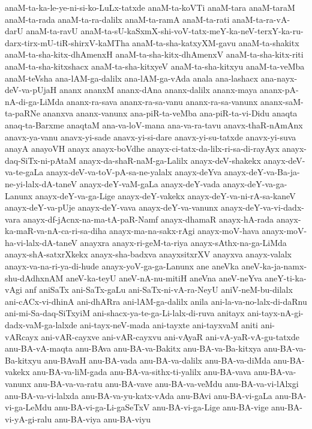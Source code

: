 {anaM-ta-ka-le-ye-ni-si-ko-LuLx-tatxde
anaM-ta-koVTi
anaM-tara
anaM-taraM
anaM-ta-rada
anaM-ta-ra-dalilx
anaM-ta-ramA
anaM-ta-rati
anaM-ta-ra-vA-darU
anaM-ta-ravU
anaM-ta-sU-kaSxmX-shi-voV-tatx-meY-ka-neV-terxY-ka-ru-darx-tirx-mU-tiR-shirxV-kaMTha
anaM-ta-sha-katxyXM-gavu
anaM-ta-shakitx
anaM-ta-sha-kitx-dhAmenxH
anaM-ta-sha-kitx-dhAmenxV
anaM-ta-sha-kitx-riti
anaM-ta-sha-kitxshacx
anaM-ta-sha-kitxyeV
anaM-ta-sha-kitxyu
anaM-ta-veMba
anaM-teVsha
ana-lAM-ga-dalilx
ana-lAM-ga-vAda
anala
ana-lashacx
ana-nayx-deV-va-pUjaH
ananx
ananxM
ananx-dAna
ananx-dalilx
ananx-maya
ananx-pA-nA-di-ga-LiMda
ananx-ra-sava
ananx-ra-sa-vanu
ananx-ra-sa-vanunx
ananx-saM-ta-paRNe
ananxva
ananx-vanunx
ana-piR-ta-veMba
ana-piR-ta-vi-Didu
anaqta
anaq-ta-Barxme
anaqtaM
ana-va-loV-mana
ana-va-ra-tavu
anavx-thaR-nAmAnx
anavx-ya-vanu
anavx-yi-sade
anavx-yi-si-dare
anavx-yi-su-tatxde
anavx-yi-suva
anayA
anayoVH
anayx
anayx-boVdhe
anayx-ci-tatx-da-lilx-ri-sa-di-rayAyx
anayx-daq-SiTx-ni-pAtaM
anayx-da-shaR-naM-ga-Lalilx
anayx-deV-shakekx
anayx-deV-va-te-gaLa
anayx-deV-va-toV-pA-sa-ne-yalalx
anayx-deYva
anayx-deY-va-Ba-ja-ne-yi-lalx-dA-taneV
anayx-deY-vaM-gaLa
anayx-deY-vada
anayx-deY-va-ga-Lanunx
anayx-deY-va-ga-Lige
anayx-deY-vakekx
anayx-deY-va-ni-rA-sa-kaneV
anayx-deY-va-pUje
anayx-deY-vava
anayx-deY-va-vanunx
anayx-deY-va-vi-dadx-vara
anayx-df-jAcnx-na-ma-tA-paR-Namf
anayx-dhamaR
anayx-hA-rada
anayx-ka-maR-va-nA-ca-ri-sa-diha
anayx-ma-na-sakx-rAgi
anayx-moV-hava
anayx-moV-ha-vi-lalx-dA-taneV
anayxra
anayx-ri-geM-ta-riya
anayx-sAthx-na-ga-LiMda
anayx-shA-satxrXkekx
anayx-sha-badxva
anayxsitxrXV
anayxva
anayx-valalx
anayx-va-na-ri-ya-di-hude
anayx-yoV-ga-ga-Lanunx
ane
aneVka
aneV-ka-ja-namx-shu-dAdhxnAM
aneV-ka-teyU
aneV-nA-nu-mitiH
aneVna
aneV-neYva
aneY-ti-ka-vAgi
anf
aniSaTx
ani-SaTx-gaLu
ani-SaTx-ni-vA-ra-NeyU
aniV-neM-bu-dilalx
ani-cACx-vi-dhinA
ani-dhARra
ani-lAM-ga-dalilx
anila
ani-la-va-no-lalx-di-daRnu
ani-mi-Sa-daq-SiTxyiM
ani-shacx-ya-te-ga-Li-lalx-di-ruva
anitayx
ani-tayx-nA-gi-dadx-vaM-ga-lalxde
ani-tayx-neV-mada
ani-tayxte
ani-tayxvaM
aniti
ani-vARcayx
ani-vAR-cayxve
ani-vAR-cayxvu
ani-vAyaR
ani-vA-yaR-vA-gu-tatxde
anu-BA-vA-maqta
anu-BAva
anu-BA-va-Bakitx
anu-BA-va-Ba-kitxya
anu-BA-va-Ba-kitxyu
anu-BAvaH
anu-BA-vada
anu-BA-va-dalilx
anu-BA-va-diMda
anu-BA-vakekx
anu-BA-va-liM-gada
anu-BA-va-sithx-ti-yalilx
anu-BA-vava
anu-BA-va-vanunx
anu-BA-va-va-ratu
anu-BA-vave
anu-BA-va-veMdu
anu-BA-va-vi-lAlxgi
anu-BA-va-vi-lalxda
anu-BA-va-yu-katx-vAda
anu-BAvi
anu-BA-vi-gaLa
anu-BA-vi-ga-LeMdu
anu-BA-vi-ga-Li-gaSeTxV
anu-BA-vi-ga-Lige
anu-BA-vige
anu-BA-vi-yA-gi-ralu
anu-BA-viya
anu-BA-viyu
}
